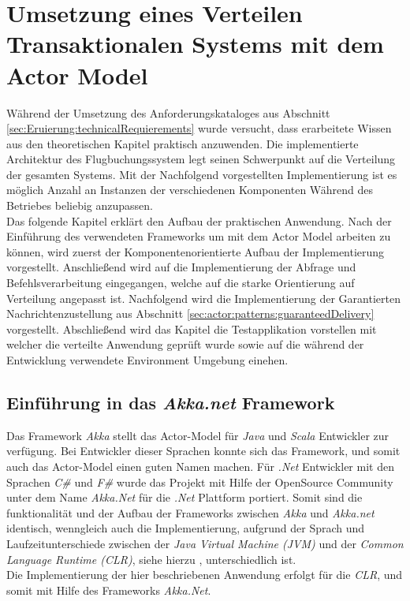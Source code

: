 \chapter{Umsetzung eines Verteilen Transaktionalen Systems mit dem Actor Model} 
\label{cha:practicalDevelopment}

Während der Umsetzung des Anforderungskataloges aus Abschnitt \ref{sec:Eruierung:technicalRequierements} wurde versucht, dass erarbeitete Wissen aus den theoretischen Kapitel praktisch anzuwenden. Die implementierte Architektur des Flugbuchungssystem legt seinen Schwerpunkt auf die Verteilung der gesamten Systems. Mit der Nachfolgend vorgestellten Implementierung ist es möglich Anzahl an Instanzen der verschiedenen Komponenten Während des Betriebes beliebig anzupassen. \\
Das folgende Kapitel erklärt den Aufbau der praktischen Anwendung. Nach der Einführung des verwendeten Frameworks um mit dem Actor Model arbeiten zu können, wird zuerst der Komponentenorientierte Aufbau der Implementierung vorgestellt. Anschließend wird auf die Implementierung der Abfrage und Befehlsverarbeitung eingegangen, welche auf die starke Orientierung auf Verteilung angepasst ist. Nachfolgend wird die Implementierung der Garantierten Nachrichtenzustellung aus Abschnitt \ref{sec:actor:patterns:guaranteedDelivery} vorgestellt. Abschließend wird das Kapitel die Testapplikation vorstellen mit welcher die verteilte Anwendung geprüft wurde sowie auf die während der Entwicklung verwendete Environment Umgebung einehen.

\section{Einführung in das \textit{Akka.net} Framework}
Das Framework \textit{Akka} stellt das Actor-Model für \textit{Java} und \textit{Scala} Entwickler zur verfügung. Bei Entwickler dieser Sprachen konnte sich das Framework, und somit auch das Actor-Model einen guten Namen machen. Für \textit{.Net} Entwickler mit den Sprachen \textit{C\#} und \textit{F\#} wurde das Projekt mit Hilfe der OpenSource Community unter dem Name \textit{Akka.Net} für die \textit{.Net} Plattform portiert. Somit sind die funktionalität und der Aufbau der Frameworks zwischen \textit{Akka} und \textit{Akka.net} identisch, wenngleich auch die Implementierung, aufgrund der Sprach und Laufzeitunterschiede zwischen der \textit{Java Virtual Machine (JVM)} und der \textit{Common Language Runtime (CLR)}, siehe hierzu \cite{JvmVsClrsinger2003jvm}, unterschiedlich ist. \\
Die Implementierung der hier beschriebenen Anwendung erfolgt für die \textit{CLR}, und somit mit Hilfe des Frameworks \textit{Akka.Net}. 

